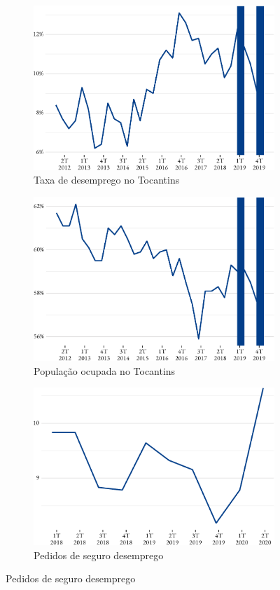 \begin{figure}[!h]
	\begin{subfigure}{\linewidth}
		\caption{Taxa de desemprego no Tocantins}
		\includegraphics{fig/tx_desemprego_to-1.pdf}
	\end{subfigure}
	\begin{subfigure}{\linewidth}
		\caption{População ocupada no Tocantins}
		\includegraphics{fig/pop_ocupada-1.pdf}
	\end{subfigure}
	\begin{subfigure}{\linewidth}
		\caption{Pedidos de seguro desemprego}
		\includegraphics{fig/pedido_segudo_desem-1.pdf}

\end{subfigure}
\end{figure}
